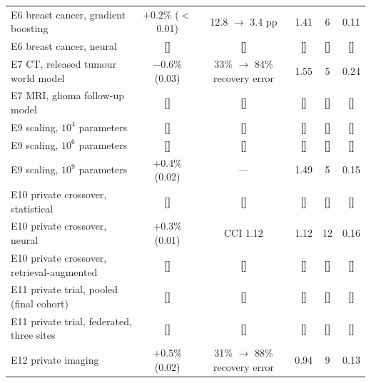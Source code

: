 \documentclass[11pt,a4paper]{article}
\newcommand{\tbd}[1]{{\color{red}\textbf{[#1]}}}
\newcommand{\CCI}{\mathrm{CCI}}
\begin{document}
\begin{table}[!htbp]
\begin{tabularx}{\textwidth}{@{}p{4.2cm} C C c c C@{}}
E6 breast cancer, gradient boosting & $+0.2$\% ($<$0.01) & 12.8 $\to$ 3.4 pp & 1.41 & 6 & 0.11\\
E6 breast cancer, neural & \tbd{} & \tbd{} & \tbd{} & \tbd{} & \tbd{}\\
E7 CT, released tumour world model & $-0.6$\% (0.03) & 33\% $\to$ 84\% recovery error & 1.55 & 5 & 0.24\\
E7 MRI, glioma follow-up model & \tbd{} & \tbd{} & \tbd{} & \tbd{} & \tbd{}\\
E9 scaling, $10^4$ parameters & \tbd{} & \tbd{} & \tbd{} & \tbd{} & \tbd{}\\
E9 scaling, $10^6$ parameters & \tbd{} & \tbd{} & \tbd{} & \tbd{} & \tbd{}\\
E9 scaling, $10^9$ parameters & $+0.4$\% (0.02) & --- & 1.49 & 5 & 0.15\\
E10 private crossover, statistical & \tbd{} & \tbd{} & \tbd{} & \tbd{} & \tbd{}\\
E10 private crossover, neural & $+0.3$\% (0.01) & $\CCI$ 1.12 & 1.12 & 12 & 0.16\\
E10 private crossover, retrieval-augmented & \tbd{} & \tbd{} & \tbd{} & \tbd{} & \tbd{}\\
E11 private trial, pooled (final cohort) & \tbd{} & \tbd{} & \tbd{} & \tbd{} & \tbd{}\\
E11 private trial, federated, three sites & \tbd{} & \tbd{} & \tbd{} & \tbd{} & \tbd{}\\
E12 private imaging & $+0.5$\% (0.02) & 31\% $\to$ 88\% recovery error & 0.94 & 9 & 0.13\\
\bottomrule\end{tabularx}
\end{table}
\FloatBarrier
\end{document}
